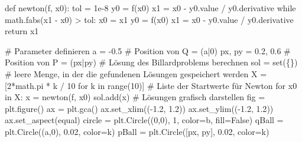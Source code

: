 \documentclass[
  a4paper,
  DIV=11]{scrreprt}
\newenvironment{Shaded}{\begin{snugshade}}{\end{snugshade}}
\newcommand{\BuiltInTok}[1]{\textcolor[rgb]{0.00,0.23,0.31}{#1}}
\newcommand{\CommentTok}[1]{\textcolor[rgb]{0.37,0.37,0.37}{#1}}
\newcommand{\ControlFlowTok}[1]{\textcolor[rgb]{0.00,0.23,0.31}{#1}}
\newcommand{\DecValTok}[1]{\textcolor[rgb]{0.68,0.00,0.00}{#1}}
\newcommand{\FloatTok}[1]{\textcolor[rgb]{0.68,0.00,0.00}{#1}}
\newcommand{\KeywordTok}[1]{\textcolor[rgb]{0.00,0.23,0.31}{#1}}
\newcommand{\NormalTok}[1]{\textcolor[rgb]{0.00,0.23,0.31}{#1}}
\newcommand{\OperatorTok}[1]{\textcolor[rgb]{0.37,0.37,0.37}{#1}}
\newcommand{\StringTok}[1]{\textcolor[rgb]{0.13,0.47,0.30}{#1}}
\newcommand{\VariableTok}[1]{\textcolor[rgb]{0.07,0.07,0.07}{#1}}
\theoremstyle{definition}
\theoremstyle{definition}
\theoremstyle{remark}
\begin{document}
\begin{tcolorbox}
\begin{Shaded}
\begin{Highlighting}[]
\KeywordTok{def}\NormalTok{ newton(f, x0):}
\NormalTok{    tol }\OperatorTok{=} \FloatTok{1e{-}8}
\NormalTok{    y0 }\OperatorTok{=}\NormalTok{ f(x0)}
\NormalTok{    x1 }\OperatorTok{=}\NormalTok{ x0 }\OperatorTok{{-}}\NormalTok{ y0.value }\OperatorTok{/}\NormalTok{ y0.derivative}
    \ControlFlowTok{while}\NormalTok{ math.fabs(x1 }\OperatorTok{{-}}\NormalTok{ x0) }\OperatorTok{\textgreater{}}\NormalTok{ tol:}
\NormalTok{        x0 }\OperatorTok{=}\NormalTok{ x1}
\NormalTok{        y0 }\OperatorTok{=}\NormalTok{ f(x0)}
\NormalTok{        x1 }\OperatorTok{=}\NormalTok{ x0 }\OperatorTok{{-}}\NormalTok{ y0.value }\OperatorTok{/}\NormalTok{ y0.derivative}
    \ControlFlowTok{return}\NormalTok{ x1}

\CommentTok{\# Parameter definieren}
\NormalTok{a }\OperatorTok{=} \OperatorTok{{-}}\FloatTok{0.5}          \CommentTok{\# Position von Q = (a|0)}
\NormalTok{px, py }\OperatorTok{=} \FloatTok{0.2}\NormalTok{, }\FloatTok{0.6} \CommentTok{\# Position von P = (px|py)}
\CommentTok{\# Lösung des Billardproblems berechnen}
\NormalTok{sol }\OperatorTok{=} \BuiltInTok{set}\NormalTok{(\{\}) }\CommentTok{\# leere Menge, in der die gefundenen Lösungen gespeichert werden}
\NormalTok{X }\OperatorTok{=}\NormalTok{ [}\DecValTok{2}\OperatorTok{*}\NormalTok{math.pi }\OperatorTok{*}\NormalTok{ k }\OperatorTok{/} \DecValTok{10} \ControlFlowTok{for}\NormalTok{ k }\KeywordTok{in} \BuiltInTok{range}\NormalTok{(}\DecValTok{10}\NormalTok{)]  }\CommentTok{\# Liste der Startwerte für Newton}
\ControlFlowTok{for}\NormalTok{ x0 }\KeywordTok{in}\NormalTok{ X:}
\NormalTok{    x }\OperatorTok{=}\NormalTok{ newton(f, x0)}
\NormalTok{    sol.add(x)}
\CommentTok{\# Lösungen grafisch darstellen}
\NormalTok{fig }\OperatorTok{=}\NormalTok{ plt.figure()}
\NormalTok{ax }\OperatorTok{=}\NormalTok{ plt.gca()}
\NormalTok{ax.set\_xlim((}\OperatorTok{{-}}\FloatTok{1.2}\NormalTok{, }\FloatTok{1.2}\NormalTok{))}
\NormalTok{ax.set\_ylim((}\OperatorTok{{-}}\FloatTok{1.2}\NormalTok{, }\FloatTok{1.2}\NormalTok{))}
\NormalTok{ax.set\_aspect(}\StringTok{\textquotesingle{}equal\textquotesingle{}}\NormalTok{)}
\NormalTok{circle }\OperatorTok{=}\NormalTok{ plt.Circle((}\DecValTok{0}\NormalTok{,}\DecValTok{0}\NormalTok{), }\DecValTok{1}\NormalTok{, color}\OperatorTok{=}\StringTok{\textquotesingle{}b\textquotesingle{}}\NormalTok{, fill}\OperatorTok{=}\VariableTok{False}\NormalTok{)}
\NormalTok{qBall }\OperatorTok{=}\NormalTok{ plt.Circle((a,}\DecValTok{0}\NormalTok{), }\FloatTok{0.02}\NormalTok{, color}\OperatorTok{=}\StringTok{\textquotesingle{}k\textquotesingle{}}\NormalTok{)}
\NormalTok{pBall }\OperatorTok{=}\NormalTok{ plt.Circle([px, py], }\FloatTok{0.02}\NormalTok{, color}\OperatorTok{=}\StringTok{\textquotesingle{}k\textquotesingle{}}\NormalTok{)}

\end{Highlighting}
\end{Shaded}
\end{tcolorbox}
\end{document}
